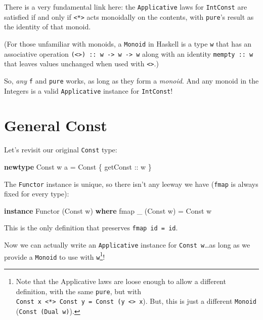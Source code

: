 \documentclass[]{article}
\newenvironment{Shaded}{}{}
\newcommand{\DataTypeTok}[1]{\textcolor[rgb]{0.56,0.13,0.00}{#1}}
\newcommand{\FunctionTok}[1]{\textcolor[rgb]{0.02,0.16,0.49}{#1}}
\newcommand{\KeywordTok}[1]{\textcolor[rgb]{0.00,0.44,0.13}{\textbf{#1}}}
\newcommand{\NormalTok}[1]{#1}
\newcommand{\OtherTok}[1]{\textcolor[rgb]{0.00,0.44,0.13}{#1}}
\begin{document}
There is a very fundamental link here: the \texttt{Applicative} laws for
\texttt{IntConst} are satisfied if and only if
\texttt{\textless{}*\textgreater{}} acts monoidally on the contents, with
\texttt{pure}'s result as the identity of that monoid.

(For those unfamiliar with monoids, a \texttt{Monoid} in Haskell is a type
\texttt{w} that has an associative operation
\texttt{(\textless{}\textgreater{})\ ::\ w\ -\textgreater{}\ w\ -\textgreater{}\ w}
along with an identity \texttt{mempty\ ::\ w} that leaves values unchanged when
used with \texttt{\textless{}\textgreater{}}.)

So, \emph{any} \texttt{f} and \texttt{pure} works, as long as they form a
\emph{monoid}. And any monoid in the Integers is a valid \texttt{Applicative}
instance for \texttt{IntConst}!

\hypertarget{general-const}{%
\section{General Const}\label{general-const}}

Let's revisit our original \texttt{Const} type:

\begin{Shaded}
\begin{Highlighting}[]
\KeywordTok{newtype} \DataTypeTok{Const}\NormalTok{ w a }\OtherTok{=} \DataTypeTok{Const}\NormalTok{ \{}\OtherTok{ getConst ::}\NormalTok{ w \}}
\end{Highlighting}
\end{Shaded}

The \texttt{Functor} instance is unique, so there isn't any leeway we have
(\texttt{fmap} is always fixed for every type):

\begin{Shaded}
\begin{Highlighting}[]
\KeywordTok{instance} \DataTypeTok{Functor}\NormalTok{ (}\DataTypeTok{Const}\NormalTok{ w) }\KeywordTok{where}
    \FunctionTok{fmap}\NormalTok{ \_ (}\DataTypeTok{Const}\NormalTok{ w) }\OtherTok{=} \DataTypeTok{Const}\NormalTok{ w}
\end{Highlighting}
\end{Shaded}

This is the only definition that preserves \texttt{fmap\ id\ =\ id}.

Now we can actually write an \texttt{Applicative} instance for
\texttt{Const\ w}\ldots as long as we provide a \texttt{Monoid} to use with
\texttt{w}\footnote{Note that the Applicative laws are loose enough to allow a
  different definition, with the same \texttt{pure}, but with
  \texttt{Const\ x\ \textless{}*\textgreater{}\ Const\ y\ =\ Const\ (y\ \textless{}\textgreater{}\ x}).
  But, this is just a different \texttt{Monoid} (\texttt{Const\ (Dual\ w)}).}!
\end{document}
